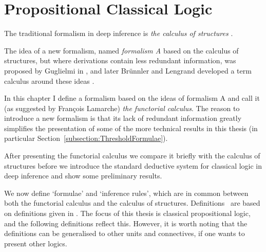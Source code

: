 \chapter{Propositional Classical Logic}\label{chapter:PropositionalClassicalLogic}

The traditional formalism in deep inference is \emph{the calculus of structures} \cite{Gugl:06:A-System:kl}.


The idea of a new formalism, named \emph{formalism A} based on the calculus of structures, but where derivations contain less redundant information, was proposed by Guglielmi in \cite{Gugl:04:Formalis:am}, and later Br\"{u}nnler and Lengrand developed a term calculus around these ideas \cite{BrunLeng:05:On-Two-F:jf}.

In this chapter I define a formalism based on the ideas of formalism A and call it (as suggested by Fran\c{c}ois Lamarche) \emph{the functorial calculus}. The reason to introduce a new formalism is that its lack of redundant information greatly simplifies the presentation of some of the more technical results in this thesis (in particular Section~\ref{subsection:ThresholdFormulae}).

After presenting the functorial calculus we compare it briefly with the calculus of structures before we introduce the standard deductive system for classical logic in deep inference and show some preliminary results.

We now define `formulae' and `inference rules', which are in common between both the functorial calculus and the calculus of structures. Definitions~ are based on definitions given in \cite{BrusGugl:07:On-the-P:fk}. The focus of this thesis is classical propositional logic, and the following definitions reflect this. However, it is worth noting that the definitions can be generalised to other units and connectives, if one wants to present other logics.

